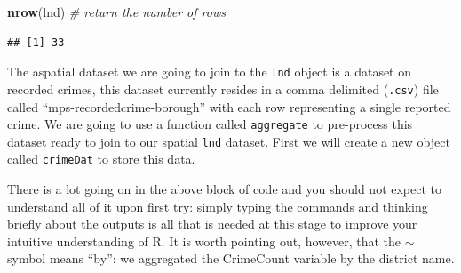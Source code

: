 \documentclass[]{article}
\newenvironment{Shaded}{}{}
\newcommand{\KeywordTok}[1]{\textcolor[rgb]{0.00,0.44,0.13}{\textbf{{#1}}}}
\newcommand{\DataTypeTok}[1]{\textcolor[rgb]{0.56,0.13,0.00}{{#1}}}
\newcommand{\DecValTok}[1]{\textcolor[rgb]{0.25,0.63,0.44}{{#1}}}
\newcommand{\StringTok}[1]{\textcolor[rgb]{0.25,0.44,0.63}{{#1}}}
\newcommand{\CommentTok}[1]{\textcolor[rgb]{0.38,0.63,0.69}{\textit{{#1}}}}
\newcommand{\NormalTok}[1]{{#1}}
\begin{document}
\begin{Shaded}
\begin{Highlighting}[]
\KeywordTok{nrow}\NormalTok{(lnd)  }\CommentTok{# return the number of rows}
\end{Highlighting}
\end{Shaded}
\begin{verbatim}
## [1] 33
\end{verbatim}
The aspatial dataset we are going to join to the \texttt{lnd} object is
a dataset on recorded crimes, this dataset currently resides in a comma
delimited (\texttt{.csv}) file called ``mps-recordedcrime-borough'' with
each row representing a single reported crime. We are going to use a
function called \texttt{aggregate} to pre-process this dataset ready to
join to our spatial \texttt{lnd} dataset. First we will create a new
object called \texttt{crimeDat} to store this data.

\begin{Shaded}
\end{Shaded}
There is a lot going on in the above block of code and you should not
expect to understand all of it upon first try: simply typing the
commands and thinking briefly about the outputs is all that is needed at
this stage to improve your intuitive understanding of R. It is worth
pointing out, however, that the \texttt{\ensuremath{\sim}} symbol means
``by'': we aggregated the CrimeCount variable by the district name.
\end{document}
